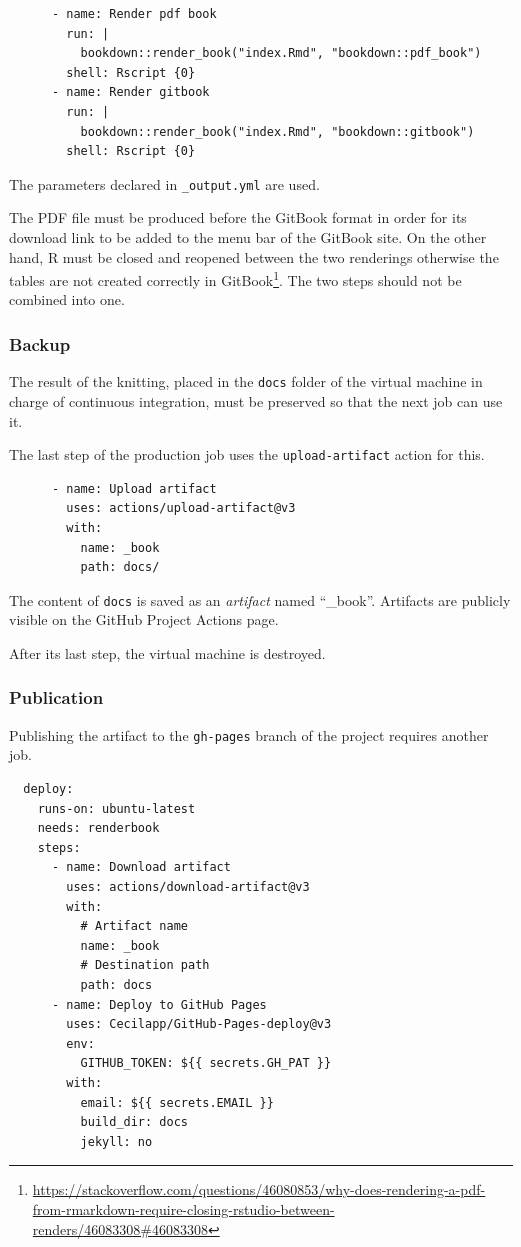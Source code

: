 \documentclass[
  12pt,
  american,
  a4paper,
  extrafontsizes,onecolumn,openright
  ]{memoir}
\newlength{\rf}
\begin{document}
\begin{verbatim}
      - name: Render pdf book
        run: |
          bookdown::render_book("index.Rmd", "bookdown::pdf_book")
        shell: Rscript {0}
      - name: Render gitbook
        run: |
          bookdown::render_book("index.Rmd", "bookdown::gitbook")
        shell: Rscript {0}
\end{verbatim}

The parameters declared in \texttt{\_output.yml} are used.

The PDF file must be produced before the GitBook format in order for its download link to be added to the menu bar of the GitBook site.
On the other hand, R must be closed and reopened between the two renderings otherwise the tables are not created correctly in GitBook\footnote{\url{https://stackoverflow.com/questions/46080853/why-does-rendering-a-pdf-from-rmarkdown-require-closing-rstudio-between-renders/46083308\#46083308}}.
The two steps should not be combined into one.

\subsubsection{Backup}\label{backup}

The result of the knitting, placed in the \texttt{docs} folder of the virtual machine in charge of continuous integration, must be preserved so that the next job can use it.

The last step of the production job uses the \texttt{upload-artifact} action for this.

\begin{verbatim}
      - name: Upload artifact
        uses: actions/upload-artifact@v3
        with:
          name: _book
          path: docs/
\end{verbatim}

The content of \texttt{docs} is saved as an \emph{artifact} named ``\_book''.
Artifacts are publicly visible on the GitHub Project Actions page.

After its last step, the virtual machine is destroyed.

\subsubsection{Publication}\label{publication}

Publishing the artifact to the \texttt{gh-pages} branch of the project requires another job.

\begin{verbatim}
  deploy:
    runs-on: ubuntu-latest
    needs: renderbook
    steps:
      - name: Download artifact
        uses: actions/download-artifact@v3
        with:
          # Artifact name
          name: _book
          # Destination path
          path: docs
      - name: Deploy to GitHub Pages
        uses: Cecilapp/GitHub-Pages-deploy@v3
        env:
          GITHUB_TOKEN: ${{ secrets.GH_PAT }}
        with:
          email: ${{ secrets.EMAIL }}
          build_dir: docs
          jekyll: no
\end{verbatim}
\end{document}
